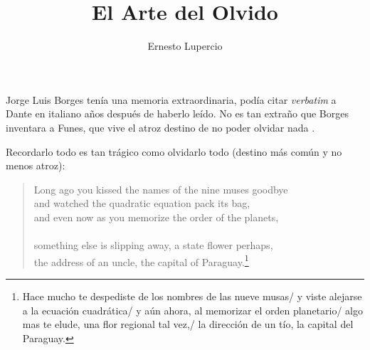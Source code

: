 \documentclass[12pt,a4paper, spanish]{amsart}
\numberwithin{equation}{section}
\theoremstyle{plain}
\theoremstyle{definition}
\begin{document}
\title{El Arte del Olvido}


\author[E. Lupercio]{Ernesto Lupercio}

\address{Cinvestav \\ Departamento de Matemáticas \\
CDMX  07360 \\ México} 










\maketitle


Jorge Luis Borges tenía una memoria extraordinaria\autocite[1]{WEBSITE:1}, podía citar \emph{verbatim} a Dante en italiano años después de haberlo leído\autocite[197]{rodriguez2005borges}. No es tan extraño que Borges inventara a Funes, que vive el atroz destino de no poder olvidar nada \autocite{borges1995funes}. 

Recordarlo todo es tan trágico como olvidarlo todo (destino más común y no menos atroz):

\begin{verse}
	Long ago you kissed the names of the nine muses goodbye\\ 
	and watched the quadratic equation pack its bag,\\
	and even now as you memorize the order of the planets,\\
\ 	\\
	something else is slipping away, a state flower perhaps,\\ 
	the address of an uncle, the capital of Paraguay.\footnote{Hace mucho te despediste de los nombres de las nueve musas/ y viste alejarse a la ecuación cuadrática/ y aún ahora, al memorizar el orden planetario/ algo mas te elude, una flor regional tal vez,/ la dirección de un tío, la capital del Paraguay.}
\end{verse}
\end{document}
